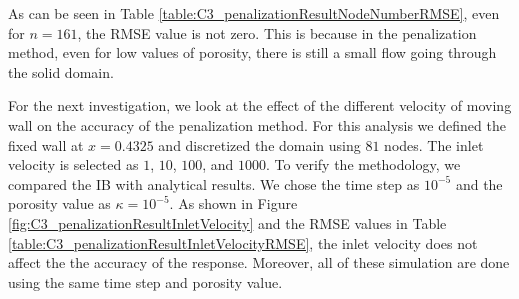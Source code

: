 As can be seen in Table \ref{table:C3_penalizationResultNodeNumberRMSE}, even for $n = 161$, the RMSE value is not zero. This is because in the penalization method, even for low values of porosity, there is still a small flow going through the solid domain.

For the next investigation, we look at the effect of the different velocity of moving wall on the accuracy of the penalization method. For this analysis we defined the fixed wall at $x=0.4325$ and discretized the domain using $81$ nodes. The inlet velocity is selected as $1$, $10$, $100$, and $1000$. To verify the methodology, we compared the IB with analytical results. We chose the time step as $10^{-5}$ and the porosity value as $\kappa = 10^{-5}$. As shown in Figure \ref{fig:C3_penalizationResultInletVelocity} and the RMSE values in Table \ref{table:C3_penalizationResultInletVelocityRMSE}, the inlet velocity does not affect the the accuracy of the response. Moreover, all of these simulation are done using the same time step and porosity value.

